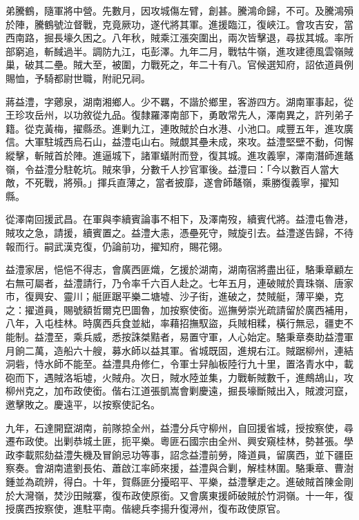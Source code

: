 \begin{pinyinscope}
弟騰鶴，隨軍將中營。先數月，因攻城傷左臂，創甚。騰鴻命歸，不可。及騰鴻殞於陣，騰鶴號泣督戰，克竟厥功，遂代將其軍。進援臨江，復峽江。會攻吉安，當西南路，掘長壕久困之。八年秋，賊乘江漲突圍出，兩次皆擊退，尋拔其城。率所部窮追，斬馘過半。調防九江，屯彭澤。九年二月，戰牯牛嶺，進攻建德風雲嶺賊巢，破其二壘。賊大至，被圍，力戰死之，年二十有八。官候選知府，詔依道員例賜恤，予騎都尉世職，附祀兄祠。

蔣益澧，字薌泉，湖南湘鄉人。少不羈，不諧於鄉里，客游四方。湖南軍事起，從王珍攻岳州，以功敘從九品。復隸羅澤南部下，勇敢常先人，澤南異之，許列弟子籍。從克黃梅，擢縣丞。進剿九江，連敗賊於白水港、小池口。咸豐五年，進攻廣信。大軍駐城西烏石山，益澧屯山右。賊覷其壘未成，來攻。益澧堅壁不動，伺懈縱擊，斬賊首於陣。進逼城下，諸軍蟻附而登，復其城。進攻義寧，澤南潛師進鼇嶺，令益澧分駐乾坑。賊來爭，分數千人抄官軍後。益澧曰：「今以數百人當大敵，不死戰，將殞。」揮兵直薄之，當者披靡，遂會師鼇嶺，乘勝復義寧，擢知縣。

從澤南回援武昌。在軍與李續賓論事不相下，及澤南歿，續賓代將。益澧屯魯港，賊攻之急，請援，續賓置之。益澧大恚，憑壘死守，賊旋引去。益澧遂告歸，不待報而行。嗣武漢克復，仍論前功，擢知府，賜花翎。

益澧家居，悒悒不得志，會廣西匪熾，乞援於湖南，湖南宿將盡出征，駱秉章顧左右無可屬者，益澧請行，乃令率千六百人赴之。七年五月，連破賊於賣珠嶺、唐家市，復興安、靈川；艇匪踞平樂二塘墟、沙子街，進破之，焚賊艇，薄平樂，克之：擢道員，賜號額哲爾克巴圖魯，加按察使銜。巡撫勞崇光疏請留於廣西補用，八年，入屯桂林。時廣西兵食並絀，率藉招撫馭盜，兵賊相糅，橫行無忌，疆吏不能制。益澧至，乘兵威，悉按誅桀黠者，易置守軍，人心始定。駱秉章奏助益澧軍月餉二萬，造船六十艘，募水師以益其軍。省城既固，進規右江。賊踞柳州，連結洞砦，恃水師不能至。益澧具舟修仁，令軍士舁舢板陸行九十里，置洛青水中，載砲而下，遇賊洛垢墟，火賊舟。次日，賊水陸並集，力戰斬賊數千，進鷓鴣山，攻柳州克之，加布政使銜。偕右江道張凱嵩會剿慶遠，掘長壕斷賊出入，賊渡河竄，邀擊敗之。慶遠平，以按察使記名。

九年，石達開竄湖南，前隊掠全州，益澧分兵守柳州，自回援省城，授按察使，尋遷布政使。出剿恭城土匪，扼平樂。粵匪石國宗由全州、興安窺桂林，勢甚張。學政李載熙劾益澧失機及冒餉忌功等事，詔念益澧前勞，降道員，留廣西，並下疆臣察奏。會湖南遣劉長佑、蕭啟江率師來援，益澧與合剿，解桂林圍。駱秉章、曹澍鍾並為疏辨，得白。十年，賀縣匪分擾昭平、平樂，益澧擊走之。進破賊首陳金剛於大灣嶺，焚沙田賊寨，復布政使原銜。又會廣東援師破賊於竹洞嶺。十一年，復授廣西按察使，進駐平南。偕總兵李揚升復潯州，復布政使原官。


\end{pinyinscope}
